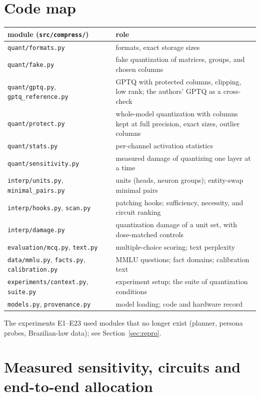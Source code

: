 \documentclass[11pt]{article}
\newcommand{\code}[1]{\texttt{#1}}
\begin{document}
\section{Code map}
\begin{center}\small
\begin{tabular}{lp{7.4cm}}
\toprule
module (\code{src/compress/}) & role\\
\midrule
\code{quant/formats.py} & formats, exact storage sizes\\
\code{quant/fake.py} & fake quantization of matrices, groups, and chosen columns\\
\code{quant/gptq.py}, \code{gptq\_reference.py} & GPTQ with protected columns, clipping, low rank; the authors' GPTQ as a cross-check\\
\code{quant/protect.py} & whole-model quantization with columns kept at full precision, exact sizes, outlier columns\\
\code{quant/stats.py} & per-channel activation statistics\\
\code{quant/sensitivity.py} & measured damage of quantizing one layer at a time\\
\code{interp/units.py}, \code{minimal\_pairs.py} & units (heads, neuron groups); entity-swap minimal pairs\\
\code{interp/hooks.py}, \code{scan.py} & patching hooks; sufficiency, necessity, and circuit ranking\\
\code{interp/damage.py} & quantization damage of a unit set, with dose-matched controls\\
\code{evaluation/mcq.py}, \code{text.py} & multiple-choice scoring; text perplexity\\
\code{data/mmlu.py}, \code{facts.py}, \code{calibration.py} & MMLU questions; fact domains; calibration text\\
\code{experiments/context.py}, \code{suite.py} & experiment setup; the suite of quantization conditions\\
\code{models.py}, \code{provenance.py} & model loading; code and hardware record\\
\bottomrule
\end{tabular}
\end{center}
The experiments E1--E23 used modules that no longer exist (planner, persona probes, Brazilian-law data); see Section~\ref{sec:repro}.


\section{Measured sensitivity, circuits and end-to-end allocation}
\label{app:circuits}
\end{document}
